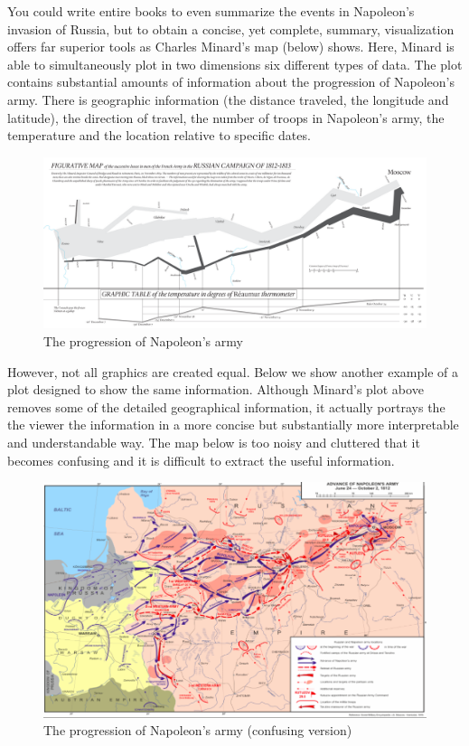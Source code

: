 You could write entire books to even summarize the events in Napoleon's invasion of Russia, but to obtain a concise, yet complete, summary, visualization offers far superior tools as Charles Minard's map (below) shows. Here, Minard is able to simultaneously plot in two dimensions six different types of data. The plot contains substantial amounts of information about the progression of Napoleon's army. There is geographic information (the distance traveled, the longitude and latitude), the direction of travel, the number of troops in Napoleon's army, the temperature and the location relative to specific dates.



\begin{figure}[H]
\begin{center}
\includegraphics[scale=0.2]{napoleongood.png}
\end{center}
\caption{The progression of Napoleon's army}
\label{fig:napoleon}
\end{figure}

However, not all graphics are created equal. Below we show another example of a plot designed to show the same information. Although Minard's plot above removes some of the detailed geographical information, it actually portrays the the viewer the information in a more concise but substantially more interpretable and understandable way. The map below is too noisy and cluttered that it becomes confusing and it is difficult to extract the useful information.


\begin{figure}[H]
\begin{center}
\includegraphics[scale=0.3]{napoleon.png}
\end{center}
\caption{The progression of Napoleon's army (confusing version)}
\label{fig:napoleon}
\end{figure}



